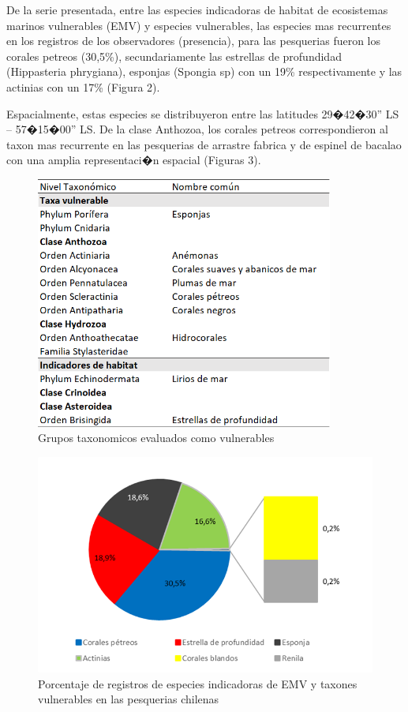 \documentclass[
  super,
  preprint,
  3p]{elsarticle}
\begin{document}
De la serie presentada, entre las especies indicadoras de habitat de
ecosistemas marinos vulnerables (EMV) y especies vulnerables, las
especies mas recurrentes en los registros de los observadores
(presencia), para las pesquerias fueron los corales petreos (30,5\%),
secundariamente las estrellas de profundidad (Hippasteria phrygiana),
esponjas (Spongia sp) con un 19\% respectivamente y las actinias con un
17\% (Figura 2).

Espacialmente, estas especies se distribuyeron entre las latitudes
29�42�30'' LS -- 57�15�00'' LS. De la clase Anthozoa, los corales
petreos correspondieron al taxon mas recurrente en las pesquerias de
arrastre fabrica y de espinel de bacalao con una amplia representaci�n
espacial (Figuras 3).

\begin{figure}

{\centering \includegraphics[width=3.85417in,height=\textheight]{especies.png}

}

\caption{Grupos taxonomicos evaluados como vulnerables}

\end{figure}

\begin{figure}

{\centering \includegraphics{grafico-pie.png}

}

\caption{Porcentaje de registros de especies indicadoras de EMV y
taxones vulnerables en las pesquerias chilenas}

\end{figure}
\end{document}
